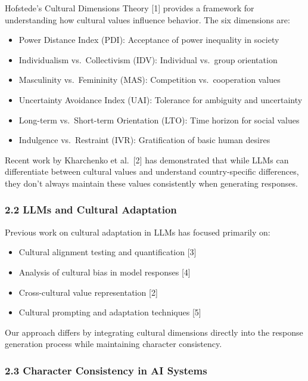 \documentclass[
]{article}
\providecommand{\tightlist}{%
  \setlength{\itemsep}{0pt}\setlength{\parskip}{0pt}}
\begin{document}
Hofstede's Cultural Dimensions Theory {[}1{]} provides a framework for
understanding how cultural values influence behavior. The six dimensions
are:

\begin{itemize}
\tightlist
\item
  Power Distance Index (PDI): Acceptance of power inequality in society
\item
  Individualism vs.~Collectivism (IDV): Individual vs.~group orientation
\item
  Masculinity vs.~Femininity (MAS): Competition vs.~cooperation values
\item
  Uncertainty Avoidance Index (UAI): Tolerance for ambiguity and
  uncertainty
\item
  Long-term vs.~Short-term Orientation (LTO): Time horizon for social
  values
\item
  Indulgence vs.~Restraint (IVR): Gratification of basic human desires
\end{itemize}

Recent work by Kharchenko et al.~{[}2{]} has demonstrated that while
LLMs can differentiate between cultural values and understand
country-specific differences, they don't always maintain these values
consistently when generating responses.

\subsubsection{2.2 LLMs and Cultural
Adaptation}\label{llms-and-cultural-adaptation}

Previous work on cultural adaptation in LLMs has focused primarily on: 
\begin{itemize}
  \tightlist
  \item
    Cultural alignment testing and quantification {[}3{]}
  \item 
    Analysis of cultural bias in model responses {[}4{]}
  \item 
    Cross-cultural value representation {[}2{]}
  \item 
    Cultural prompting and adaptation techniques {[}5{]}
  \end{itemize}

Our approach differs by integrating cultural dimensions directly into
the response generation process while maintaining character consistency.

\subsubsection{2.3 Character Consistency in AI
Systems}\label{character-consistency-in-ai-systems}
\end{document}
